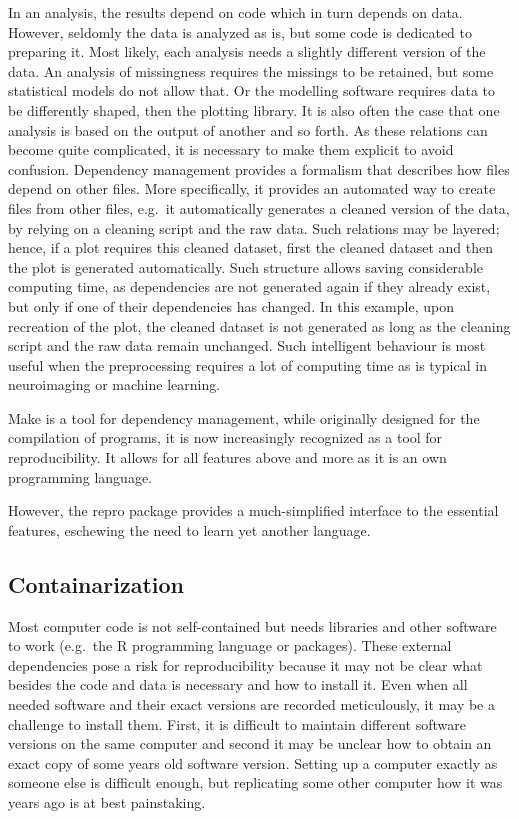 \documentclass[12pt,a4paper,]{article}
\begin{document}
In an analysis, the results depend on code which in turn depends on data.
However, seldomly the data is analyzed as is, but some code is dedicated to preparing it.
Most likely, each analysis needs a slightly different version of the data.
An analysis of missingness requires the missings to be retained, but some statistical models do not allow that.
Or the modelling software requires data to be differently shaped, then the plotting library.
It is also often the case that one analysis is based on the output of another and so forth.
As these relations can become quite complicated, it is necessary to make them explicit to avoid confusion.
Dependency management provides a formalism that describes how files depend on other files.
More specifically, it provides an automated way to create files from other files, e.g.~it automatically generates a cleaned version of the data, by relying on a cleaning script and the raw data.
Such relations may be layered; hence, if a plot requires this cleaned dataset, first the cleaned dataset and then the plot is generated automatically.
Such structure allows saving considerable computing time, as dependencies are not generated again if they already exist, but only if one of their dependencies has changed.
In this example, upon recreation of the plot, the cleaned dataset is not generated as long as the cleaning script and the raw data remain unchanged.
Such intelligent behaviour is most useful when the preprocessing requires a lot of computing time as is typical in neuroimaging or machine learning.

Make is a tool for dependency management, while originally designed for the compilation of programs, it is now increasingly recognized as a tool for reproducibility.
It allows for all features above and more as it is an own programming language.

However, the repro package provides a much-simplified interface to the essential features, eschewing the need to learn yet another language.

\hypertarget{containarization}{%
\subsection{Containarization}\label{containarization}}

Most computer code is not self-contained but needs libraries and other software to work (e.g.~the R programming language or packages).
These external dependencies pose a risk for reproducibility because it may not be clear what besides the code and data is necessary and how to install it.
Even when all needed software and their exact versions are recorded meticulously, it may be a challenge to install them.
First, it is difficult to maintain different software versions on the same computer and second it may be unclear how to obtain an exact copy of some years old software version.
Setting up a computer exactly as someone else is difficult enough, but replicating some other computer how it was years ago is at best painstaking.
\end{document}
